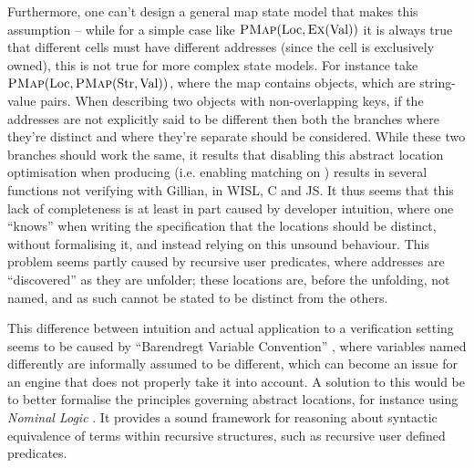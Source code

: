 Furthermore, one can't design a general map state model that makes this assumption -- while for a simple case like $\textsc{PMap}(\text{Loc}, \textsc{Ex}(\text{Val}))$ it is always true that different cells must have different addresses (since the cell is exclusively owned), this is not true for more complex state models. For instance take $\textsc{PMap}(\text{Loc}, \textsc{PMap}(\text{Str}, \text{Val}))$, where the map contains objects, which are string-value pairs. When describing two objects with non-overlapping keys, if the addresses are not explicitly said to be different then both the branches where they're distinct and where they're separate should be considered. While these two branches should work the same, it results that disabling this abstract location optimisation when producing (i.e. enabling matching on \produce) results in several functions not verifying with Gillian, in WISL, C and JS. It thus seems that this lack of completeness is at least in part caused by developer intuition, where one ``knows'' when writing the specification that the locations should be distinct, without formalising it, and instead relying on this unsound behaviour. This problem seems partly caused by recursive user predicates, where addresses are ``discovered'' as they are unfolder; these locations are, before the unfolding, not named, and as such cannot be stated to be distinct from the others.

This difference between intuition and actual application to a verification setting seems to be caused by ``Barendregt Variable Convention'' \cite{formalbarendregt}, where variables named differently are informally assumed to be different, which can become an issue for an engine that does not properly take it into account. A solution to this would be to better formalise the principles governing abstract locations, for instance using \emph{Nominal Logic} \cite{nominallogic,formalbarendregt}. It provides a sound framework for reasoning about syntactic equivalence of terms within recursive structures, such as recursive user defined predicates.
